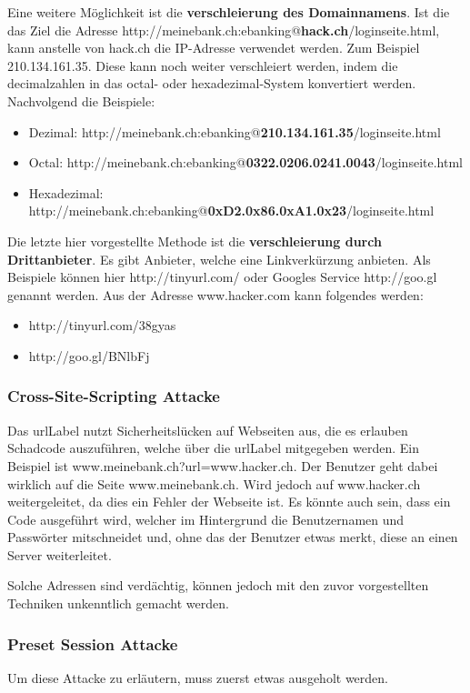 Eine weitere Möglichkeit ist die \textbf{verschleierung des Domainnamens}. Ist die das Ziel die Adresse http://meinebank.ch:ebanking@\textbf{hack.ch}/loginseite.html, kann anstelle von hack.ch die IP-Adresse verwendet werden. Zum Beispiel 210.134.161.35. Diese kann noch weiter verschleiert werden, indem die decimalzahlen in das octal- oder hexadezimal-System konvertiert werden. Nachvolgend die Beispiele:
\begin{itemize}
\item Dezimal: http://meinebank.ch:ebanking@\textbf{210.134.161.35}/loginseite.html
\item Octal:  http://meinebank.ch:ebanking@\textbf{0322.0206.0241.0043}/loginseite.html
\item Hexadezimal:  http://meinebank.ch:ebanking@\textbf{0xD2.0x86.0xA1.0x23}/loginseite.html
\end{itemize}

Die letzte hier vorgestellte Methode ist die \textbf{verschleierung durch Drittanbieter}. Es gibt Anbieter, welche eine Linkverkürzung anbieten. Als Beispiele können hier http://tinyurl.com/ oder Googles Service http://goo.gl genannt werden. Aus der Adresse www.hacker.com kann folgendes werden:

\begin{itemize}
\item http://tinyurl.com/38gyas
\item http://goo.gl/BNlbFj
\end{itemize}

\subsubsection{Cross-Site-Scripting Attacke}
Das \Gls{urlLabel} nutzt Sicherheitslücken auf Webseiten aus, die es erlauben Schadcode auszuführen, welche über die \Gls{urlLabel} mitgegeben werden. Ein Beispiel ist www.meinebank.ch?url=www.hacker.ch. Der Benutzer geht dabei wirklich auf die Seite www.meinebank.ch. Wird jedoch auf www.hacker.ch weitergeleitet, da dies ein Fehler der Webseite ist. Es könnte auch sein, dass ein Code ausgeführt wird, welcher im Hintergrund die Benutzernamen und Passwörter mitschneidet und, ohne das der Benutzer etwas merkt, diese an einen Server weiterleitet.

Solche Adressen sind verdächtig, können jedoch mit den zuvor vorgestellten Techniken unkenntlich gemacht werden.

\subsubsection{Preset Session Attacke}
Um diese Attacke zu erläutern, muss zuerst etwas ausgeholt werden.

